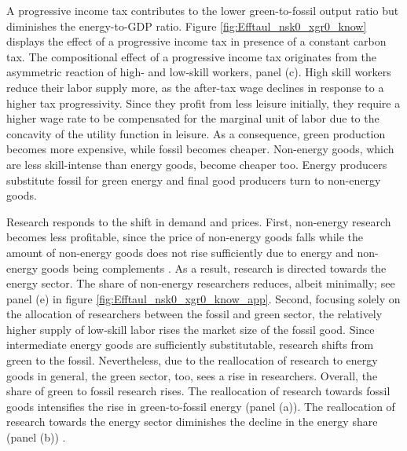  A progressive income tax contributes to the lower green-to-fossil output ratio but diminishes the energy-to-GDP ratio. Figure \ref{fig:Efftaul_nsk0_xgr0_know} displays the effect of a progressive income tax in presence of a constant carbon tax. 
 The compositional effect of a progressive income tax originates from the asymmetric reaction of high- and low-skill workers, panel (c). High skill workers reduce their labor supply more, as the after-tax wage declines in response to a higher tax progressivity. Since they profit from less leisure initially, they require a higher wage rate to be compensated for the marginal unit of labor due to the concavity of the utility function in leisure. 
 As a  consequence, green production becomes more expensive, while fossil becomes cheaper. Non-energy goods, which are less skill-intense than energy goods, become cheaper too. Energy producers substitute fossil for green energy and final good producers turn to non-energy goods. 
 
 
 Research responds to the shift in demand and prices. First, non-energy research becomes less profitable, since the price of non-energy goods falls while the amount of non-energy goods does not rise sufficiently due to energy and non-energy goods being complements . As a result, research is directed towards the energy sector. The share of non-energy researchers reduces, albeit minimally; see panel (e) in figure \ref{fig:Efftaul_nsk0_xgr0_know_app}. Second, focusing solely on the allocation of researchers between the fossil and green sector, the relatively higher supply of low-skill labor rises the market size of the fossil good. Since intermediate energy goods are sufficiently substitutable, research shifts from green to the fossil. Nevertheless, due to the reallocation of research to energy goods in general, the green sector, too, sees a rise in researchers. Overall, the share of green to fossil research rises. The reallocation of research towards fossil goods intensifies the rise in green-to-fossil energy (panel (a)). The reallocation of research towards the energy sector diminishes the decline in the energy share (panel (b)) . 
 
